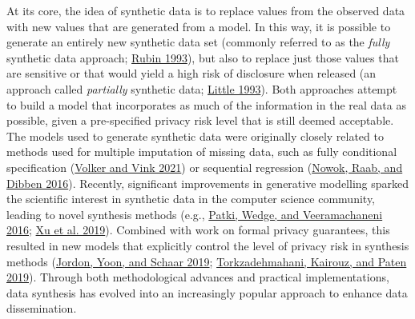 \documentclass[
]{template/style/uneceart}
\begin{document}
At its core, the idea of synthetic data is to replace values from the
observed data with new values that are generated from a model. In this
way, it is possible to generate an entirely new synthetic data set
(commonly referred to as the \emph{fully} synthetic data approach;
\protect\hyperlink{ref-rubin_statistical_1993}{Rubin 1993}), but also to
replace just those values that are sensitive or that would yield a high
risk of disclosure when released (an approach called \emph{partially}
synthetic data; \protect\hyperlink{ref-little_statistical_1993}{Little
1993}). Both approaches attempt to build a model that incorporates as
much of the information in the real data as possible, given a
pre-specified privacy risk level that is still deemed acceptable. The
models used to generate synthetic data were originally closely related
to methods used for multiple imputation of missing data, such as fully
conditional specification (\protect\hyperlink{ref-volker2021}{Volker and
Vink 2021}) or sequential regression
(\protect\hyperlink{ref-nowok2016}{Nowok, Raab, and Dibben 2016}).
Recently, significant improvements in generative modelling sparked the
scientific interest in synthetic data in the computer science community,
leading to novel synthesis methods (e.g.,
\protect\hyperlink{ref-patki2016}{Patki, Wedge, and Veeramachaneni
2016}; \protect\hyperlink{ref-xu_ctgan_2019}{Xu et al. 2019}). Combined
with work on formal privacy guarantees, this resulted in new models that
explicitly control the level of privacy risk in synthesis methods
(\protect\hyperlink{ref-jordon2018pategan}{Jordon, Yoon, and Schaar
2019}; \protect\hyperlink{ref-Torkzadehmahani2019}{Torkzadehmahani,
Kairouz, and Paten 2019}). Through both methodological advances and
practical implementations, data synthesis has evolved into an
increasingly popular approach to enhance data dissemination.
\end{document}
